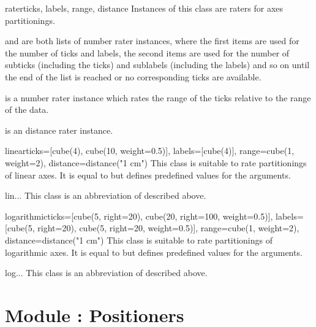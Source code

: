 \begin{classdesc}{rater}{ticks, labels, range, distance}
  Instances of this class are raters for axes partitionings.

   and  are both lists of number rater
  instances, where the first items are used for the number of ticks
  and labels, the second items are used for the number of subticks
  (including the ticks) and sublabels (including the labels) and so on
  until the end of the list is reached or no corresponding ticks are
  available.

   is a number rater instance which rates the range of the
  ticks relative to the range of the data.

   is an distance rater instance.
\end{classdesc}

\begin{classdesc}{linear}{ticks=[cube(4), cube(10, weight=0.5)],
                          labels=[cube(4)],
                          range=cube(1, weight=2),
                          distance=distance("1 cm")}
  This class is suitable to rate partitionings of linear axes. It is
  equal to  but defines predefined values for the
  arguments.
\end{classdesc}

\begin{classdesc}{lin}{...}
  This class is an abbreviation of  described above.
\end{classdesc}

\begin{classdesc}{logarithmic}{ticks=[cube(5, right=20), cube(20, right=100, weight=0.5)],
                               labels=[cube(5, right=20), cube(5, right=20, weight=0.5)],
                               range=cube(1, weight=2),
                               distance=distance("1 cm")}
  This class is suitable to rate partitionings of logarithmic axes. It
  is equal to  but defines predefined values for the
  arguments.
\end{classdesc}

\begin{classdesc}{log}{...}
  This class is an abbreviation of  described above.
\end{classdesc} %

\section{Module : Positioners} %

